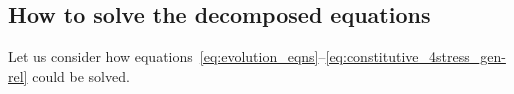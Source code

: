 \documentclass[\ifafour a4paper,12pt,\else a5paper,10pt,\fi%
onecolumn,oneside,article,%
british%
]{memoir}
\theoremstyle{remark}
\theoremstyle{innote}
\newcommand*{\mathte}[1]{\textbf{\textit{\textsf{#1}}}}
\newcommand*{\incr}{\triangle}%
\renewcommand*{\|}[1][]{\nonscript\,#1\vert\nonscript\;\mathopen{}}
\newcommand*{\yd}{N}
\newcommand*{\yTT}{\tau}
\newcommand*{\yT}{\bm{\yTT}}
\newcommand*{\ygg}{g}
\newcommand*{\yg}{\mathte{\ygg}}
\newcommand*{\yKK}{K}
\newcommand*{\yK}{\mathte{\yKK}}
\newcommand*{\ypp}{q}
\newcommand*{\yp}{\bm{\ypp}}
\newcommand*{\ye}{\epsilon}
\begin{document}
\subsection{How to solve the decomposed equations}
\label{sec:how_to_solve_3-1}

Let us consider how
equations~\eqref{eq:evolution_eqns}--\eqref{eq:constitutive_4stress_gen-rel}
could be solved.


\end{document}
